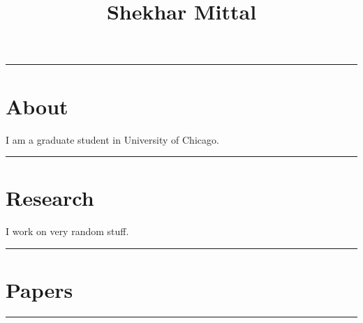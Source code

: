 \documentclass[11pt]{article}
\title{Shekhar Mittal}
\date{}
\begin{document}
\maketitle




\hrule
\section*{About}
\label{sec-1}

I am a graduate student in University of Chicago.
\hrule
\section*{Research}
\label{sec-2}

I work on very random stuff.
\hrule
\section*{Papers}
\label{sec-3}

\hrule
\end{document}
